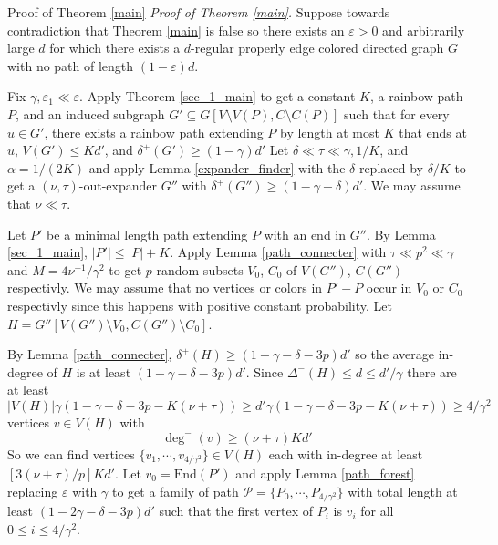 \documentclass[11pt,a4paper]{article}
\newcommand{\vep}{\varepsilon}
\newcommand{\End}{\mathrm{End}}
\begin{document}
\begin{section}{Proof of Theorem \ref{main}} \label{main_proof}
\textit{Proof of Theorem \ref{main}.} Suppose towards contradiction that Theorem \ref{main} is false so there exists an $\vep > 0$ and arbitrarily large $d$ for which there exists a $d$-regular properly edge colored directed graph $G$ with no path of length $(1 - \vep) d$.

\medskip

Fix $\gamma , \vep_1 \ll \vep$. Apply Theorem \ref{sec_1_main} to get a constant $K$, a rainbow path $P$, and an induced subgraph $G' \subseteq G[V \setminus V(P), C \setminus C(P)]$ such that for every $u \in G'$, there exists a rainbow path extending $P$ by length at most $K$ that ends at $u$, $V(G') \leq K d'$, and $\delta^+(G') \geq (1 - \gamma)d'$
\medskip
Let $\delta \ll \tau \ll \gamma, 1/K$, and $\alpha = 1/(2K)$ and apply Lemma \ref{expander_finder} with the $\delta$ replaced by $\delta/K$ to get a $(\nu, \tau)$-out-expander $G''$ with $\delta^+(G'') \geq (1 - \gamma - \delta) d'$. We may assume that $\nu \ll \tau$.

\medskip

Let $P'$ be a minimal length path extending $P$ with an end in $G''$. By Lemma \ref{sec_1_main}, $|P'| \leq |P| + K$. Apply Lemma \ref{path_connecter} with $\tau \ll p^2 \ll \gamma$ and $M = 4 \nu^{-1} /\gamma^2$ to get $p$-random subsets $V_0$, $C_0$ of $V(G'')$, $C(G'')$ respectivly. We may assume that no vertices or colors in $P' - P$ occur in $V_0$ or $C_0$ respectivly since this happens with positive constant probability. Let $H = G''[V(G'') \setminus V_0, C(G'') \setminus C_0]$.

\medskip

By Lemma \ref{path_connecter}, $\delta^+ (H) \geq (1 - \gamma - \delta - 3p) d'$ so the average in-degree of $H$ is at least $(1 - \gamma - \delta - 3p) d'$. Since $\Delta^{-}(H) \leq d \leq d'/\gamma$ there are at least
	\[
	|V(H)| \gamma (1 - \gamma - \delta - 3p - K(\nu + \tau) ) \geq d' \gamma (1 - \gamma - \delta - 3p - K(\nu + \tau) ) \geq 4/\gamma^2
	\]
vertices $v \in V(H)$ with
	\[
\deg^{-}(v) \geq  (\nu + \tau) K d'
	\]
So we can find vertices $\{v_1, \cdots, v_{4/\gamma^2} \} \in V(H)$ each with in-degree at least $ [3(\nu + \tau)/p]K d'$. Let $v_0 = \End(P')$ and apply Lemma \ref{path_forest} replacing $\vep$ with $\gamma$ to get a family of path $\mathcal P = \{P_0, \cdots, P_{ 4/\gamma^2 } \}$ with total length at least $(1 - 2 \gamma - \delta - 3p)d'$ such that the first vertex of $P_i$ is $v_i$ for all $0 \leq i \leq 4/\gamma^2$.


\end{section}
\end{document}
